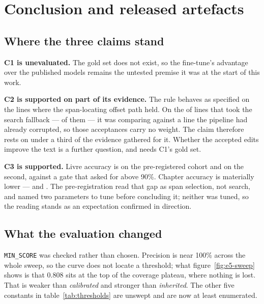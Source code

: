 \section{Conclusion and released artefacts}
\label{sec:conclusion}

\subsection{Where the three claims stand}

\textbf{C1 is unevaluated.} The gold set does not exist, so the fine-tune's
advantage over the published models remains the untested premise it was at the
start of this work.

\textbf{C2 is supported on part of its evidence.} The rule behaves as specified
on the lines where the span-locating offset path held. On the
\corrOnFindFallback{} of \corrOffered{} lines that took the search fallback ---
\corrFindFallbackShare{} of them --- it was comparing against a line the
pipeline had already corrupted, so those acceptances carry no weight. The claim
therefore rests on under a third of the evidence gathered for it. Whether the accepted edits improve the text is a
further question, and needs C1's gold set.

\textbf{C3 is supported.} Livre accuracy is \locLivreAccuracyWorkbook{} on the
pre-registered cohort and \locLivreAccuracyCatalogue{} on the second, against a
gate that asked for above 90\%. Chapter accuracy is materially lower ---
\locChapterAccuracyWorkbook{} and \locChapterAccuracyCatalogue{}. The
pre-registration read that gap as span selection, not search, and named two
parameters to tune before concluding it; neither was tuned, so the reading
stands as an expectation confirmed in direction.

\subsection{What the evaluation changed}

\texttt{MIN\_SCORE} was checked rather than chosen. Precision is near 100\%
across the whole sweep, so the curve does not locate a threshold; what
figure~\ref{fig:e5-sweep} shows is that 0.808 sits at the top of the coverage
plateau, where nothing is lost. That is weaker than \emph{calibrated} and
stronger than \emph{inherited}. The other five constants in
table~\ref{tab:thresholds} are unswept and are now at least enumerated.

